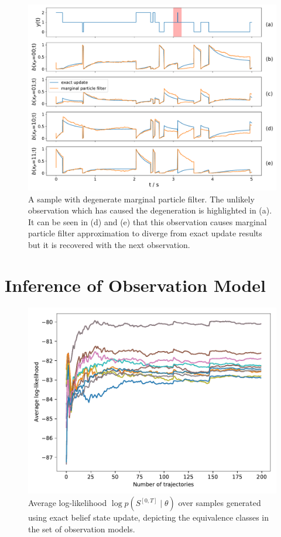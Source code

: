 \begin{figure}[H]
	\begin{center}
		\includegraphics[width=.9\textwidth]{figures/degenerate_pf/belief_traj}
		\caption[Degenerate marginal particle filter]{A sample with degenerate marginal particle filter. The unlikely observation which has caused the degeneration is highlighted in (a). It can be seen in (d) and (e) that this observation causes marginal particle filter approximation to diverge from exact update results but it is recovered with the next observation.}
		\label{fig:deg_partFilter}
	\end{center}
\end{figure}

\section{Inference of Observation Model}
\begin{figure}[t]
	\begin{center}
		\includegraphics[width=.7\textwidth]{figures/equivalence_classes/llh_exactUpdate_81model}
		\caption[Equivalence classes in the case of exact belief update]{Average log-likelihood $ \log p(S^{[0,T]} \mid \theta) $ over samples generated using exact belief state update, depicting the equivalence classes in the set of observation models.}
		\label{fig:llh_exactUpdate_81model}
	\end{center}
\end{figure}
